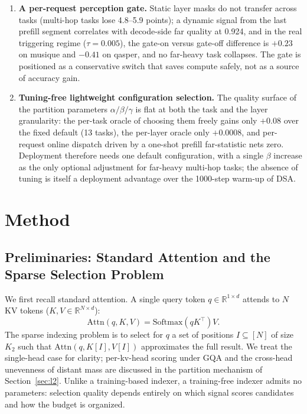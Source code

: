 \documentclass[11pt]{article}
\begin{document}
\begin{enumerate}
\item \textbf{A per-request perception gate.} Static layer masks do not transfer across tasks (multi-hop tasks lose 4.8--5.9 points); a dynamic signal from the last prefill segment correlates with decode-side far quality at 0.924, and in the real triggering regime ($\tau{=}0.005$), the gate-on versus gate-off difference is $+0.23$ on musique and $-0.41$ on qasper, and no far-heavy task collapses. The gate is positioned as a conservative switch that saves compute safely, not as a source of accuracy gain.
\item \textbf{Tuning-free lightweight configuration selection.} The quality surface of the partition parameters $\alpha/\beta/\gamma$ is flat at both the task and the layer granularity: the per-task oracle of choosing them freely gains only $+0.08$ over the fixed default (13 tasks), the per-layer oracle only $+0.0008$, and per-request online dispatch driven by a one-shot prefill far-statistic nets zero. Deployment therefore needs one default configuration, with a single $\beta$ increase as the only optional adjustment for far-heavy multi-hop tasks; the absence of tuning is itself a deployment advantage over the 1000-step warm-up of DSA.
\end{enumerate}

\section{Method}

\subsection{Preliminaries: Standard Attention and the Sparse Selection Problem}

We first recall standard attention. A single query token $q\in\mathbb{R}^{1\times d}$ attends to $N$ KV tokens ($K,V\in\mathbb{R}^{N\times d}$):
\begin{equation}
\mathrm{Attn}(q, K, V) = \mathrm{Softmax}\!\left(qK^\top\right)V.
\end{equation}
The sparse indexing problem is to select for $q$ a set of positions $I\subseteq[N]$ of size $K_2$ such that $\mathrm{Attn}(q, K[I], V[I])$ approximates the full result. We treat the single-head case for clarity; per-kv-head scoring under GQA and the cross-head unevenness of distant mass are discussed in the partition mechanism of Section~\ref{sec:l2}. Unlike a training-based indexer, a training-free indexer admits no parameters: selection quality depends entirely on which signal scores candidates and how the budget is organized.
\end{document}
